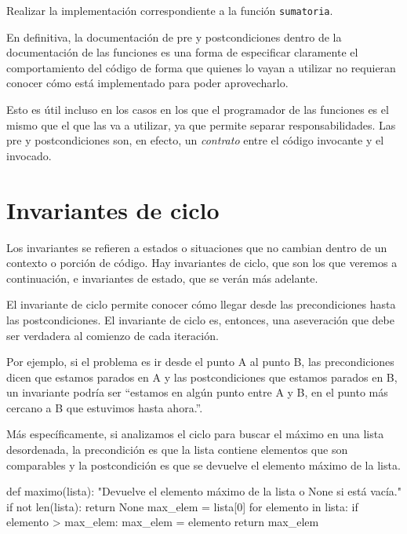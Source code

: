 \begin{ejercicio}
Realizar la implementación correspondiente a la función \lstinline!sumatoria!.
\end{ejercicio}

En definitiva, la documentación de pre y postcondiciones dentro de la documentación
de las funciones es una forma de especificar claramente el comportamiento del
código de forma que quienes lo vayan a utilizar no requieran conocer cómo está
implementado para poder aprovecharlo.

Esto es útil incluso en los casos en los que el programador de las funciones
es el mismo que el que las va a utilizar, ya que permite separar
responsabilidades. Las pre y postcondiciones son, en efecto, un
\textit{contrato} entre el código invocante y el invocado.

\section{Invariantes de ciclo}


Los invariantes se refieren a estados o situaciones que no cambian dentro
de un contexto o porción de código.  Hay invariantes de ciclo, que son los
que veremos a continuación, e invariantes de estado, que se verán más
adelante.

El invariante de ciclo permite conocer cómo llegar desde las precondiciones
hasta las postcondiciones. El invariante de ciclo es, entonces, una
aseveración que debe ser verdadera al comienzo de cada iteración.

Por ejemplo, si el problema es ir desde el punto A al punto B, las
precondiciones dicen que estamos parados en A y las postcondiciones que
estamos parados en B, un invariante podría ser ``estamos en algún punto entre
A y B, en el punto más cercano a B que estuvimos hasta ahora.''.

Más específicamente, si analizamos el ciclo para buscar el máximo en una lista
desordenada, la precondición es que la lista contiene elementos que son
comparables y la postcondición es que se devuelve el elemento máximo de la
lista.

\begin{codigo-python}
def maximo(lista):
    "Devuelve el elemento máximo de la lista o None si está vacía."
    if not len(lista):
        return None
    max_elem = lista[0]
    for elemento in lista:
        if elemento > max_elem:
            max_elem = elemento
    return max_elem
\end{codigo-python}

